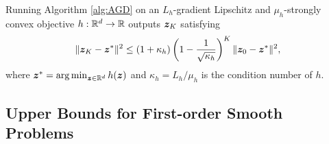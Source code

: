 \documentclass{article}
\begin{document}

 
\begin{lem} \label{lem:AGD}
Running Algorithm \ref{alg:AGD} on an $L_h$-gradient Lipschitz and $\mu_h$-strongly convex objective $h: {\mathbb{R}}^d \rightarrow {\mathbb{R}}$ outputs ${\bm{z}}_K$ satisfying
\begin{align*}
    \Vert {\bm{z}}_K - {\bm{z}}^* \Vert^2 \le (1 + \kappa_h) \left( 1 - \frac{1}{\sqrt{\kappa_h}} \right)^K \Vert {\bm{z}}_0 - {\bm{z}}^* \Vert^2,
\end{align*}
where ${\bm{z}}^* = \arg \min_{{\bm{z}} \in {\mathbb{R}}^d} h({\bm{z}})$ and $\kappa_h = L_h/ \mu_h$ is the condition number of $h$.
\end{lem}

\subsection{Upper Bounds for First-order Smooth Problems} \label{subsec:F2BA}


\end{document}
